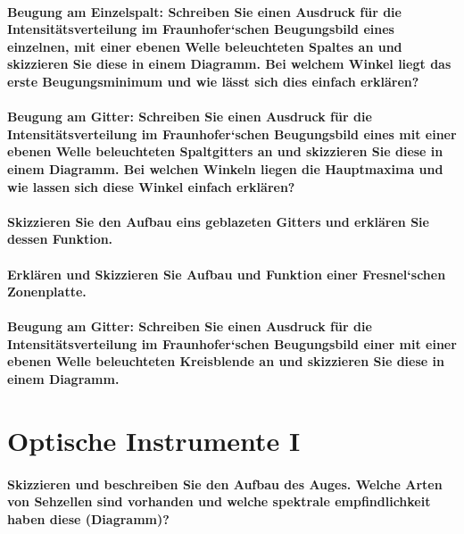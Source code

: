 \documentclass[a4paper, 11pt, parskip=half]{scrartcl}
\begin{document}
\paragraph{Beugung am Einzelspalt: Schreiben Sie einen Ausdruck für die Intensitätsverteilung im
Fraunhofer‘schen Beugungsbild eines einzelnen, mit einer ebenen Welle beleuchteten
Spaltes an und skizzieren Sie diese in einem Diagramm. Bei welchem Winkel liegt das erste
Beugungsminimum und wie lässt sich dies einfach erklären?}

\paragraph{Beugung am Gitter: Schreiben Sie einen Ausdruck für die Intensitätsverteilung im
Fraunhofer‘schen Beugungsbild eines mit einer ebenen Welle beleuchteten Spaltgitters an
und skizzieren Sie diese in einem Diagramm. Bei welchen Winkeln liegen die Hauptmaxima
und wie lassen sich diese Winkel einfach erklären?}

\paragraph{Skizzieren Sie den Aufbau eins geblazeten Gitters und erklären Sie dessen Funktion.}

\paragraph{Erklären und Skizzieren Sie Aufbau und Funktion einer Fresnel‘schen Zonenplatte.}

\paragraph{Beugung am Gitter: Schreiben Sie einen Ausdruck für die Intensitätsverteilung im
Fraunhofer‘schen Beugungsbild einer mit einer ebenen Welle beleuchteten Kreisblende an
und skizzieren Sie diese in einem Diagramm.}

\newpage

\section{Optische Instrumente I}

\paragraph{Skizzieren und beschreiben Sie den Aufbau des Auges. Welche Arten von Sehzellen sind
vorhanden und welche spektrale empfindlichkeit haben diese (Diagramm)?}
\end{document}
